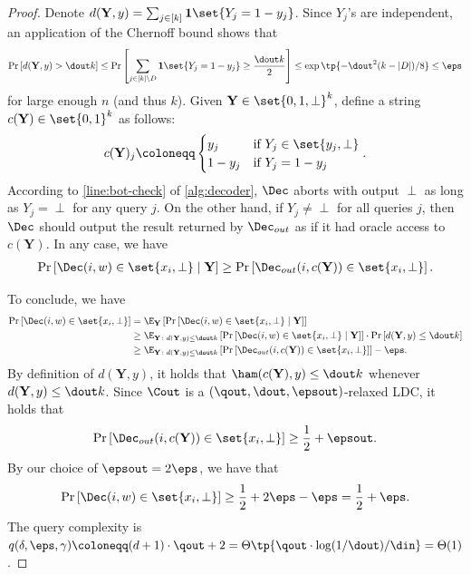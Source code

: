 \begin{proof}
	Denote $d(\mathbf{Y}, y)=\sum_{j \in [k]}\mathbf{1}\set{Y_j=1-y_j}$. 
	Since $Y_j$'s are independent, an application of the Chernoff bound shows that
	\begin{align*}
		\Pr\left[ d(\mathbf{Y},y) > \dout k \right] \le \Pr\left[ \sum_{j \in [k]\setminus D}\mathbf{1}\set{Y_j=1-y_j}\ge \frac{\dout k}{2} \right] \le \exp\tp{-\dout^2(k-|D|)/8} \le \eps
	\end{align*}
	for large enough $n$ (and thus $k$).
	Given $\mathbf{Y} \in \set{0,1,\perp}^k$, define a string $c(\mathbf{Y}) \in \set{0,1}^k$ as follows: 
	\begin{align*}
		c(\mathbf{Y})_j \coloneqq \begin{cases}
			y_j & \textup{if $Y_j \in \set{y_j, \perp}$} \\
			1-y_j & \textup{if $Y_j = 1-y_j$}
		\end{cases}.
	\end{align*}
	According to \cref{line:bot-check} of \cref{alg:decoder}, $\Dec$ aborts with output $\perp$ as long as $Y_j=\perp$ for any query $j$. 
	On the other hand, if $Y_j \neq \perp$ for all queries $j$, then $\Dec$ should output the result returned by $\Dec_{out}$ as if it had oracle access to $c(\mathbf{Y})$. 
	In any case, we have
	\begin{align*}
		\Pr\left[ \Dec(i, w) \in \set{x_i, \perp} \mid \mathbf{Y} \right] \ge \Pr\left[  \Dec_{out}(i, c(\mathbf{Y})) \in \set{x_i, \perp} \right].
	\end{align*}
	
	To conclude, we have
	\begin{align*}
		\Pr\left[ \Dec(i, w) \in \set{x_i, \perp} \right] &= \E_{\mathbf{Y}}\left[ \Pr\left[ \Dec(i, w) \in \set{x_i, \perp} \mid \mathbf{Y} \right] \right] \\
		&\ge \E_{\mathbf{Y}\colon d(\mathbf{Y}, y)\le \dout k}\left[ \Pr\left[ \Dec(i, w) \in \set{x_i, \perp} \mid \mathbf{Y} \right] \right] \cdot \Pr\left[ d(\mathbf{Y}, y) \le \dout k \right] \\
		&\ge \E_{\mathbf{Y}\colon d(\mathbf{Y}, y)\le \dout k}\left[ \Pr\left[  \Dec_{out}(i, c(\mathbf{Y})) \in \set{x_i, \perp} \right] \right] - \eps.
	\end{align*}
	By definition of $d(\mathbf{Y}, y)$, it holds that $\ham(c(\mathbf{Y}), y)\le \dout k$ whenever $d(\mathbf{Y}, y) \leq \dout k$. 
	Since $\Cout$ is a $(\qout, \dout, \epsout)$-relaxed LDC, it holds that 
	\begin{align*}
		\Pr\left[  \Dec_{out}(i, c(\mathbf{Y})) \in \set{x_i, \perp} \right] \ge \frac{1}{2} + \epsout.
	\end{align*}
	By our choice of $\epsout = 2\eps$, we have that
	\begin{align*}
		\Pr\left[ \Dec(i, w) \in \set{x_i, \perp} \right] \ge \frac{1}{2} + 2\eps - \eps = \frac{1}{2} + \eps.
	\end{align*}
	The query complexity is $q(\delta, \eps, \gamma) \coloneqq (d+1)\cdot\qout + 2 = \Theta\tp{\qout \cdot \log(1/\dout)/\din} = \Theta(1)$.
\end{proof}

